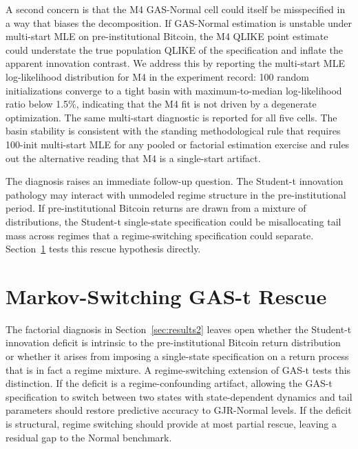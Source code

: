 A second concern is that the M4 GAS-Normal cell could itself be misspecified in a way that biases the decomposition. If GAS-Normal estimation is unstable under multi-start MLE on pre-institutional Bitcoin, the M4 QLIKE point estimate could understate the true population QLIKE of the specification and inflate the apparent innovation contrast. We address this by reporting the multi-start MLE log-likelihood distribution for M4 in the experiment record: 100 random initializations converge to a tight basin with maximum-to-median log-likelihood ratio below 1.5\%, indicating that the M4 fit is not driven by a degenerate optimization. The same multi-start diagnostic is reported for all five cells. The basin stability is consistent with the standing methodological rule that requires 100-init multi-start MLE for any pooled or factorial estimation exercise and rules out the alternative reading that M4 is a single-start artifact.

The diagnosis raises an immediate follow-up question. The Student-t innovation pathology may interact with unmodeled regime structure in the pre-institutional period. If pre-institutional Bitcoin returns are drawn from a mixture of distributions, the Student-t single-state specification could be misallocating tail mass across regimes that a regime-switching specification could separate. Section~\ref{sec:results3} tests this rescue hypothesis directly.

\section{Markov-Switching GAS-t Rescue}
\label{sec:results3}

The factorial diagnosis in Section~\ref{sec:results2} leaves open whether the Student-t innovation deficit is intrinsic to the pre-institutional Bitcoin return distribution or whether it arises from imposing a single-state specification on a return process that is in fact a regime mixture. A regime-switching extension of GAS-t tests this distinction. If the deficit is a regime-confounding artifact, allowing the GAS-t specification to switch between two states with state-dependent dynamics and tail parameters should restore predictive accuracy to GJR-Normal levels. If the deficit is structural, regime switching should provide at most partial rescue, leaving a residual gap to the Normal benchmark.

